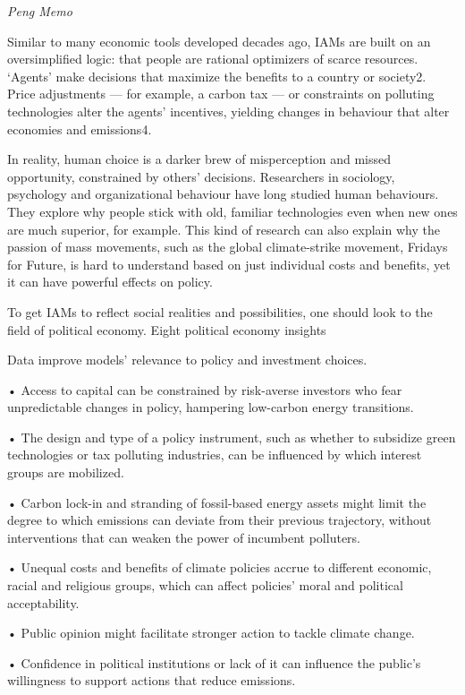 \documentclass[
]{book}
\begin{document}
\emph{Peng Memo}

Similar to many economic tools developed decades ago, IAMs are built on an oversimplified logic: that people are rational optimizers of scarce resources. `Agents' make decisions that maximize the benefits to a country or society2. Price adjustments --- for example, a carbon tax --- or constraints on polluting technologies alter the agents' incentives, yielding changes in behaviour that alter economies and emissions4.

In reality, human choice is a darker brew of misperception and missed opportunity, constrained by others' decisions. Researchers in sociology, psychology and organizational behaviour have long studied human behaviours. They explore why people stick with old, familiar technologies even when new ones are much superior, for example. This kind of research can also explain why the passion of mass movements, such as the global climate-strike movement, Fridays for Future, is hard to understand based on just individual costs and benefits, yet it can have powerful effects on policy.

To get IAMs to reflect social realities and possibilities, one should look to the field of political economy.
Eight political economy insights

Data improve models' relevance to policy and investment choices.

• Access to capital can be constrained by risk-averse investors who fear unpredictable changes in policy, hampering low-carbon energy transitions.

• The design and type of a policy instrument, such as whether to subsidize green technologies or tax polluting industries, can be influenced by which interest groups are mobilized.

• Carbon lock-in and stranding of fossil-based energy assets might limit the degree to which emissions can deviate from their previous trajectory, without interventions that can weaken the power of incumbent polluters.

• Unequal costs and benefits of climate policies accrue to different economic, racial and religious groups, which can affect policies' moral and political acceptability.

• Public opinion might facilitate stronger action to tackle climate change.

• Confidence in political institutions or lack of it can influence the public's willingness to support actions that reduce emissions.
\end{document}
